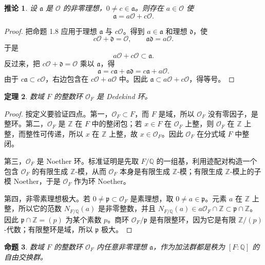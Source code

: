 \documentclass[11pt,a4paper,openany]{ctexbook}
\numberwithin{equation}{chapter}
\newcommand{\Q}{\mathbb{Q}}
\newcommand{\Z}{\mathbb{Z}}
\theoremstyle{plain}
\newtheorem{theorem}{定理}[chapter]
\newtheorem{proposition}[theorem]{命题}
\newtheorem{corollary}[theorem]{推论}
\theoremstyle{definition}
\theoremstyle{remark}
\begin{document}
\begin{corollary}
设 $\mathfrak a$ 是 $\mathcal O$ 的非零理想，$0\ne c\in\mathfrak a$。则存在 $a\in\mathcal O$ 使
\[
\mathfrak a=a\mathcal O+c\mathcal O.
\]
\end{corollary}

\begin{proof}
把命题 1.8 应用于理想 $\mathfrak a$ 与 $c\mathcal O$。得到 $a\in\mathfrak a$ 和理想 $\mathfrak d$，使
\[
c\mathcal O+\mathfrak d=\mathcal O,\qquad \mathfrak a\mathfrak d=a\mathcal O.
\]
于是
\[
a\mathcal O+c\mathcal O\subset\mathfrak a.
\]
反过来，把 $c\mathcal O+\mathfrak d=\mathcal O$ 乘以 $\mathfrak a$，得
\[
\mathfrak a=c\mathfrak a+\mathfrak a\mathfrak d
=c\mathfrak a+a\mathcal O.
\]
由于 $c\mathfrak a\subset c\mathcal O$，右边包含在 $c\mathcal O+a\mathcal O$ 中。因此 $\mathfrak a\subset a\mathcal O+c\mathcal O$，得等号。
\end{proof}

\begin{theorem}
数域 $F$ 的整数环 $\mathcal O_F$ 是 Dedekind 环。
\end{theorem}

\begin{proof}
按定义要验证四点。第一，$\mathcal O_F\subset F$，而 $F$ 是域，所以 $\mathcal O_F$ 没有零因子，是整环。第二，$\mathcal O_F$ 是 $\Z$ 在 $F$ 中的整闭包；若 $x\in F$ 在 $\mathcal O_F$ 上整，则 $\mathcal O_F$ 在 $\Z$ 上整，而整性可传递，所以 $x$ 在 $\Z$ 上整，故 $x\in\mathcal O_F$。因此 $\mathcal O_F$ 在分式域 $F$ 中整闭。

第三，$\mathcal O_F$ 是 Noether 环。标准证明是先取 $F/\Q$ 的一组基，利用迹配对构造一个包含 $\mathcal O_F$ 的有限生成 $\Z$-模，从而 $\mathcal O_F$ 本身是有限生成 $\Z$-模；有限生成 $\Z$-模上的子模 Noether，于是 $\mathcal O_F$ 作为环 Noether。

第四，非零素理想极大。若 $0\ne\mathfrak p\subset\mathcal O_F$ 是素理想，取 $0\ne a\in\mathfrak p$。元素 $a$ 在 $\Z$ 上整，所以它的范数 $N_{F/\Q}(a)$ 是非零整数，并且 $N_{F/\Q}(a)\in a\mathcal O_F\cap\Z\subset\mathfrak p\cap\Z$。因此 $\mathfrak p\cap\Z=(p)$ 为某个素数 $p$。商环 $\mathcal O_F/\mathfrak p$ 是有限整环，因为它是有限 $\Z/(p)$-代数；有限整环是域，所以 $\mathfrak p$ 极大。
\end{proof}

\begin{proposition}
数域 $F$ 的整数环 $\mathcal O_F$ 内任意非零理想 $\mathfrak a$，作为加法群都是秩为 $[F:\Q]$ 的自由交换群。
\end{proposition}
\end{document}

